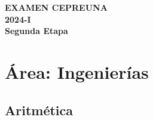 \newpage
\mbox{}               %
\newpage

\thispagestyle{empty}

\vspace*{\fill}
\begin{center}
	{\Huge\bfseries EXAMEN CEPREUNA }\\[10pt]
	{\Huge\bfseries 2024-I}\\[10pt]
	{\Large\bfseries Segunda Etapa}
\end{center}
\vspace*{\fill}

\clearpage

\section*{Área: Ingenierías}


\subsection*{Aritmética}

